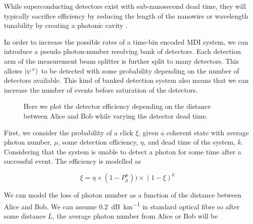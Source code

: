 While superconducting detectors exist with sub-nanosecond dead time, they will typically sacrifice efficiency by reducing the length of the nanowire \cite{} or wavelength tunability by creating a photonic cavity \cite{}.

In order to increase the possible rates of a time-bin encoded \ac{MDI} system, we can introduce a pseudo photon-number resolving bank of detectors. Each detection arm of the measurement beam splitter is further split to many detectors. This allows $\ket{\psi^+}$ to be detected with some probability depending on the number of detectors available. This kind of banked detection system also means that we can increase the number of events before saturation of the detectors. 

\begin{figure}[tbp]
	\caption[Detector efficiency depending on detector dead time]{Here we plot the detector efficiency depending on the distance between Alice and Bob while varying the detector dead time. }
	\label{fig:det_eff_dead_time}
\end{figure}

First, we consider the probability of a click $\xi$, given a coherent state with average photon number, $\mu$, some detection efficiency, $\eta$, and dead time of the system, $k$. Considering that the system is unable to detect a photon for some time after a successful event. The efficiency is modelled as

\begin{equation}
	\xi = \eta \times ( 1 - P^\mu_0) ) \times (1 - \xi)^k
\end{equation}

We can model the loss of photon number as a function of the distance between Alice and Bob. We can assume \SI{0.2}{dB\per\km} in standard optical fibre so after some distance $L$, the average photon number from Alice or Bob will be

